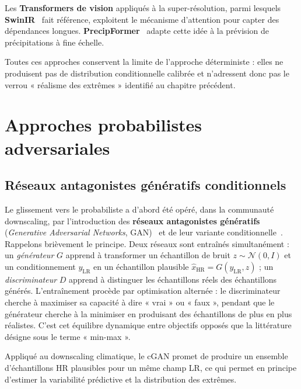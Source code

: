 \documentclass[14pt,a4paper,openany]{extreport}
\theoremstyle{definition}
\newcommand{\LR}{\ensuremath{\text{LR}}}
\newcommand{\HR}{\ensuremath{\text{HR}}}
\newcommand{\yLR}{\ensuremath{y_{\LR}}}
\begin{document}
Les \textbf{Transformers de vision} appliqués à la super-résolution, parmi lesquels \textbf{SwinIR}~\cite{liang_swinir_2021} fait référence, exploitent le mécanisme d'attention pour capter des dépendances longues. \textbf{PrecipFormer}~\cite{lopezgomez_precipformer_2023} adapte cette idée à la prévision de précipitations à fine échelle.

Toutes ces approches conservent la limite de l'approche déterministe : elles ne produisent pas de distribution conditionnelle calibrée et n'adressent donc pas le verrou « réalisme des extrêmes » identifié au chapitre précédent.

\section{Approches probabilistes adversariales}
\label{sec:soa-adv}

\subsection{Réseaux antagonistes génératifs conditionnels}
\label{ssec:soa-cgan}

Le glissement vers le probabiliste a d'abord été opéré, dans la communauté downscaling, par l'introduction des \textbf{réseaux antagonistes génératifs} (\emph{Generative Adversarial Networks}, GAN)~\cite{goodfellow_gan_2014} et de leur variante conditionnelle~\cite{mirza_cgan_2014}. Rappelons brièvement le principe. Deux réseaux sont entraînés simultanément : un \emph{générateur} $G$ apprend à transformer un échantillon de bruit $z \sim \mathcal{N}(0, I)$ et un conditionnement $\yLR$ en un échantillon plausible $\hat{x}_{\HR} = G(\yLR, z)$ ; un \emph{discriminateur} $D$ apprend à distinguer les échantillons réels des échantillons générés. L'entraînement procède par optimisation alternée : le discriminateur cherche à maximiser sa capacité à dire « vrai » ou « faux », pendant que le générateur cherche à la minimiser en produisant des échantillons de plus en plus réalistes. C'est cet équilibre dynamique entre objectifs opposés que la littérature désigne sous le terme « min-max ».

Appliqué au downscaling climatique, le cGAN promet de produire un ensemble d'échantillons HR plausibles pour un même champ LR, ce qui permet en principe d'estimer la variabilité prédictive et la distribution des extrêmes.
\end{document}
